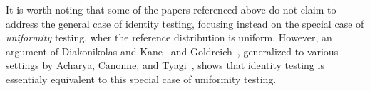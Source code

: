 \documentclass[10pt]{article}
\begin{document}
It is worth noting that some of the papers referenced above do not claim to address the general case of identity testing, focusing instead on the special case of \emph{uniformity} testing, wher the reference distribution is uniform. However, an argument of Diakonikolas and Kane~\cite{DiakonikolasK16} and Goldreich~\cite{Goldreich16}, generalized to various settings by Acharya, Canonne, and Tyagi~\cite[Appendix~A]{AcharyaCT19b}, shows that identity testing is essentialy equivalent to this special case of uniformity testing.
\end{document}

